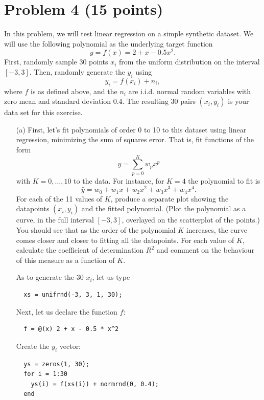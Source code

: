 \documentclass[10pt]{article}
\begin{document}
\section*{Problem 4 (15 points)}
In this problem, we will test linear regression on a simple synthetic dataset. We will use the following polynomial as the underlying target function
\[
y = f(x) = 2 + x - 0.5 x^2.
\]
First, randomly sample 30 points $x_i$ from the uniform distribution on the interval $[-3,3]$. Then, randomly generate the $y_i$ using
\[
y_i = f(x_i) + n_i,
\]
where $f$ is as defined above, and the $n_i$ are i.i.d. normal random variables with zero mean and standard deviation 0.4. The resulting 30 pairs $(x_i, y_i)$ is your data set for this exercise.
\begin{itemize}
  \item[(a)] First, let's fit polynomials of order 0 to 10 to this dataset using linear regression, minimizing the sum of squares error. That is, fit functions of the form
  \[
  \hat{y} = \sum_{p = 0}^K w_px^p
  \]
  with $K = 0, \dots, 10$ to the data. For instance, for $K = 4$ the polynomial to fit is 
  \[
  \hat{y} = w_0 + w_1x + w_2x^2 + w_3x^3 + w_4x^4.
  \]
  For each of the 11 values of $K$, produce a separate plot showing the datapoints $(x_i, y_i)$ and the fitted polynomial. (Plot the polynomial as a curve, in the full interval $[-3, 3]$, overlayed on the scatterplot of the points.) You should see that as the order of the polynomial $K$ increases, the curve comes closer and closer to fitting all the datapoints. For each value of $K$, calculate the coefficient of determination $R^2$ and comment on the behaviour of this measure as a function of $K$.
  
  \color{black}
  As to generate the 30 $x_i$, let us type
  \begin{verbatim}
  xs = unifrnd(-3, 3, 1, 30);
  \end{verbatim}
  Next, let us declare the function $f$:
  \begin{verbatim}
  f = @(x) 2 + x - 0.5 * x^2
  \end{verbatim}
  Create the $y_i$ vector:
  \begin{verbatim}
  ys = zeros(1, 30);
  for i = 1:30
    ys(i) = f(xs(i)) + normrnd(0, 0.4);
  end
  \end{verbatim}
  

\end{itemize}
\end{document}
